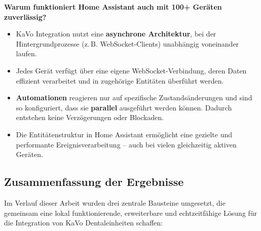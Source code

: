\vspace{1em}
\noindent
\textbf{Warum funktioniert Home Assistant auch mit 100+ Geräten zuverlässig?}
\begin{itemize}
    \item KaVo Integration nutzt eine \textbf{asynchrone Architektur}, bei der Hintergrundprozesse (z.\,B. WebSocket-Clients) unabhängig voneinander laufen.\\
    
    \item Jedes Gerät verfügt über eine eigene WebSocket-Verbindung, deren Daten effizient verarbeitet und in zugehörige Entitäten überführt werden.\\
    
    \item \textbf{Automationen} reagieren nur auf spezifische Zustandsänderungen und sind so konfiguriert, dass sie \textbf{parallel} ausgeführt werden können. Dadurch entstehen keine Verzögerungen oder Blockaden.\\
    
    \item Die Entitätenstruktur in Home Assistant ermöglicht eine gezielte und performante Ereignisverarbeitung – auch bei vielen gleichzeitig aktiven Geräten.
\end{itemize}

\subsection{Zusammenfassung der Ergebnisse}

Im Verlauf dieser Arbeit wurden drei zentrale Bausteine umgesetzt, die gemeinsam eine lokal funktionierende, erweiterbare und echtzeitfähige Lösung für die Integration von KaVo Dentaleinheiten schaffen:

